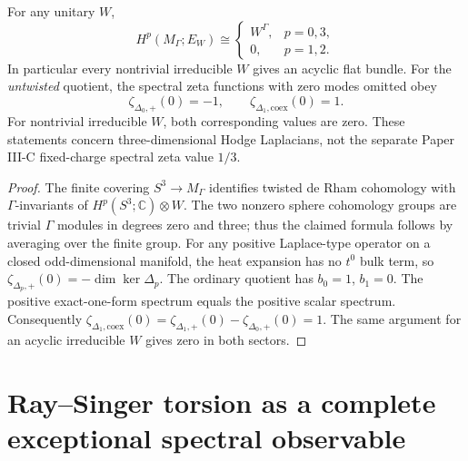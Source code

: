 \documentclass[11pt]{article}
\begin{document}
\begin{proposition}
\label{p1b:prop:v13-cohomology-zeta}
For any unitary $W$,
\begin{equation}
\label{p1b:eq:v13-twisted-cohomology}
 H^p(M_\Gamma;E_W)\cong
 \begin{cases}
 W^\Gamma,&p=0,3,\\
 0,&p=1,2.
 \end{cases}
\end{equation}
In particular every nontrivial irreducible $W$ gives an acyclic
flat bundle.  For the \emph{untwisted} quotient, the spectral zeta
functions with zero modes omitted obey
\begin{equation}
\label{p1b:eq:v13-zeta-zero}
 \boxed{\zeta_{\Delta_0,+}(0)=-1,\qquad
 \zeta_{\Delta_1,\mathrm{coex}}(0)=1.}
\end{equation}
For nontrivial irreducible $W$, both corresponding values are zero.
These statements concern three-dimensional Hodge Laplacians, not the
separate Paper III-C fixed-charge spectral zeta value $1/3$.
\end{proposition}
\begin{proof}
The finite covering $S^3\to M_\Gamma$ identifies twisted de Rham
cohomology with $\Gamma$-invariants of
$H^p(S^3;\mathbb C)\otimes W$.  The two nonzero sphere cohomology
groups are trivial $\Gamma$ modules in degrees zero and three;
thus the claimed formula follows by averaging over the finite group.
For any positive Laplace-type operator on a closed odd-dimensional
manifold, the heat expansion has no $t^0$ bulk term, so
$\zeta_{\Delta_p,+}(0)=-\dim\ker\Delta_p$. The ordinary quotient
has $b_0=1$, $b_1=0$. The positive exact-one-form spectrum equals
the positive scalar spectrum. Consequently
$\zeta_{\Delta_1,\mathrm{coex}}(0)
 =\zeta_{\Delta_1,+}(0)-\zeta_{\Delta_0,+}(0)=1$.
The same argument for an acyclic irreducible $W$ gives zero in
both sectors.
\end{proof}

\section{Ray--Singer torsion as a complete exceptional spectral observable}
\label{p1b:sec:v13-torsion}
\end{document}
